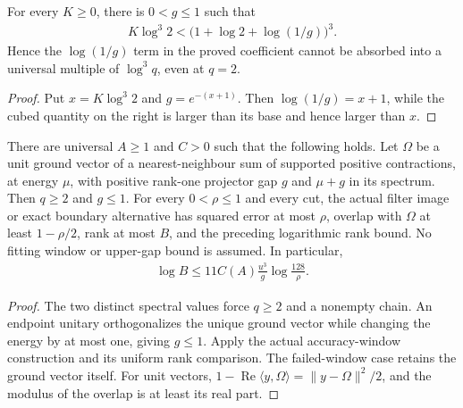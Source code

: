 \begin{lemma}
    \label{thm:aklv_gap_logarithm_not_absorbable}
    \leanok
    For every $K\ge0$, there is $0<g\le1$ such that
    \begin{align*}
        K\log^3 2<\bigl(1+\log2+\log(1/g)\bigr)^3.
    \end{align*}
    Hence the $\log(1/g)$ term in the proved coefficient cannot be absorbed
    into a universal multiple of $\log^3q$, even at $q=2$.
\end{lemma}
\begin{proof}
    \leanok
    Put $x=K\log^3 2$ and $g=e^{-(x+1)}$. Then
    $\log(1/g)=x+1$, while the cubed quantity on the right is larger than
    its base and hence larger than $x$.
\end{proof}

\begin{lemma}
    \label{thm:aklv_sharp_physical_per_cut}
    \leanok
    There are universal $A\ge1$ and $C>0$ such that the following holds.
    Let $\Omega$ be a unit ground vector of a nearest-neighbour sum of
    supported positive contractions, at energy $\mu$, with positive
    rank-one projector gap $g$ and $\mu+g$ in its spectrum.
    Then $q\ge2$ and $g\le1$. For every $0<\rho\le1$ and every cut,
    the actual filter image or exact boundary alternative has squared
    error at most $\rho$, overlap with $\Omega$ at least $1-\rho/2$,
    rank at most $B$, and the preceding logarithmic rank bound. No fitting
    window or upper-gap bound is assumed. In particular,
    \begin{align*}
        \log B\le 11C(A)\frac{u^3}{g}\log\frac{128}{\rho}.
    \end{align*}
\end{lemma}
\begin{proof}
    \leanok
    The two distinct spectral values force $q\ge2$ and a nonempty chain.
    An endpoint unitary orthogonalizes the unique ground vector while
    changing the energy by at most one, giving $g\le1$.
    Apply the actual accuracy-window construction and its uniform rank
    comparison. The failed-window case retains the ground vector itself.
    For unit vectors,
    $1-\operatorname{Re}\langle y,\Omega\rangle
        =\|y-\Omega\|^2/2$, and the modulus of the overlap is at least its
    real part.
\end{proof}

